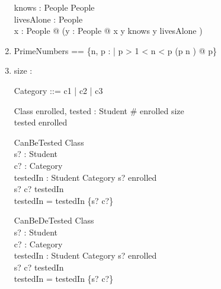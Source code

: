 \documentclass[12pt,letterpaper]{article}
\begin{document}
\begin{enumerate}
      \begin{axdef}
        knows : People \rel People \\
        livesAlone : \power People \\
      \where
        \forall x : People @ (\exists y : People @ x \mapsto y \in knows \land y \in livesAlone )
      \end{axdef}
    \item
      \begin{zed}
        PrimeNumbers == \{n, p : \nat | p > 1  < n < p \land (p \mod n ) @ p\}
      \end{zed}
    \item
      \begin{zed}
        [ Student ]
      \end{zed}
      \begin{axdef}
        size : \nat
      \end{axdef}
      \begin{zed}
      Category ::= c1 | c2 | c3
      \end{zed}

      \begin{schema}{Class}
        enrolled, tested : \power Student
      \where
        \# enrolled \leq size \\
        tested \subseteq enrolled
      \end{schema}

      \begin{schema}{CanBeTested}
        \Xi Class \\
        s? : Student \\
        c? : Category \\
        testedIn : Student \rel Category
      \where
        s? \in enrolled \\
        s? \mapsto c? \notin testedIn \\
        testedIn = testedIn \cup \{s? \mapsto c?\}
      \end{schema}

      \begin{schema}{CanBeDeTested}
        \Xi Class \\
        s? : Student \\
        c? : Category \\
        testedIn : Student \rel Category
      \where
        s? \in enrolled \\
        s? \mapsto c? \in testedIn \\
        testedIn = testedIn \setminus \{s? \mapsto c?\}
      \end{schema}


\end{enumerate}
\end{document}

